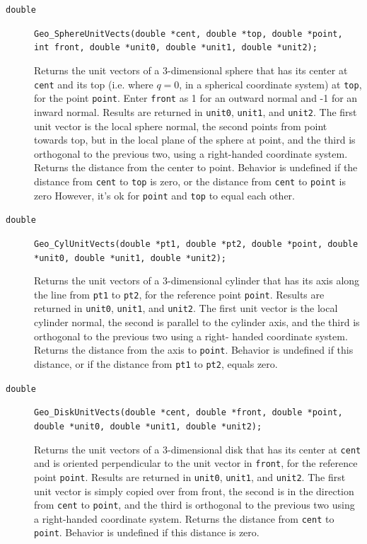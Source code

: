 \documentclass[11pt]{article}
\newcommand {\ttt} {\texttt}
\begin{document}
\begin{description}
\item[\ttt{double}]
\ttt{Geo\_SphereUnitVects(double *cent, double *top, double *point, int front, double *unit0, double *unit1, double *unit2);}

Returns the unit vectors of a 3-dimensional sphere that has its center at \ttt{cent} and its
top (i.e. where $q=0$, in a spherical coordinate system) at \ttt{top}, for the point \ttt{point}. Enter \ttt{front} as 1 for an outward normal and -1 for an inward normal. Results are returned in \ttt{unit0}, \ttt{unit1}, and \ttt{unit2}. The first unit vector is the local sphere normal, the second points from point towards top, but in the local plane of the sphere at point, and the third is orthogonal to the previous two, using a right-handed coordinate system. Returns the distance from the center to point. Behavior is undefined if the distance from \ttt{cent} to \ttt{top} is zero, or the distance from \ttt{cent} to \ttt{point} is zero However, it's ok for \ttt{point} and \ttt{top} to equal each other.

\item[\ttt{double}]
\ttt{Geo\_CylUnitVects(double *pt1, double *pt2, double *point, double *unit0, double *unit1, double *unit2);}

Returns the unit vectors of a 3-dimensional cylinder that has its axis along the line from \ttt{pt1} to \ttt{pt2}, for the reference point \ttt{point}. Results are returned in \ttt{unit0}, \ttt{unit1}, and \ttt{unit2}. The first unit vector is the local cylinder normal, the second is parallel to the cylinder axis, and the third is orthogonal to the previous two using a right- handed coordinate system. Returns the distance from the axis to \ttt{point}. Behavior is undefined if this distance, or if the distance from \ttt{pt1} to \ttt{pt2}, equals zero.

\item[\ttt{double}]
\ttt{Geo\_DiskUnitVects(double *cent, double *front, double *point, double *unit0, double *unit1, double *unit2);}

Returns the unit vectors of a 3-dimensional disk that has its center at \ttt{cent} and is oriented perpendicular to the unit vector in \ttt{front}, for the reference point \ttt{point}. Results are returned in \ttt{unit0}, \ttt{unit1}, and \ttt{unit2}. The first unit vector is simply copied over from front, the second is in the direction from \ttt{cent} to \ttt{point}, and the third is orthogonal to the previous two using a right-handed coordinate system. Returns the distance from \ttt{cent} to \ttt{point}. Behavior is undefined if this distance is zero.


\end{description}
\end{document}
